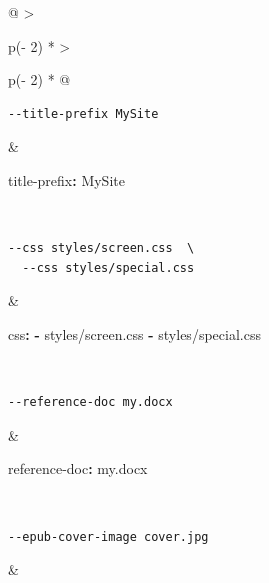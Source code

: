 \documentclass[
  b5paper
]{book}
\newenvironment{Shaded}{}{}
\newcommand{\AttributeTok}[1]{\textcolor[rgb]{0.49,0.56,0.16}{#1}}
\newcommand{\FunctionTok}[1]{\textcolor[rgb]{0.02,0.16,0.49}{#1}}
\newcommand{\KeywordTok}[1]{\textcolor[rgb]{0.00,0.44,0.13}{\textbf{#1}}}
\begin{document}
\begin{longtable}[]{@{}
  >{\raggedright\arraybackslash}p{(\columnwidth - 2\tabcolsep) * }
  >{\raggedright\arraybackslash}p{(\columnwidth - 2\tabcolsep) * }@{}}
\begin{minipage}[t]{\linewidth}
\begin{verbatim}
--title-prefix MySite
\end{verbatim}
\end{minipage} & \begin{minipage}[t]{\linewidth}\raggedright
\begin{Shaded}
\begin{Highlighting}[]
\FunctionTok{title{-}prefix}\KeywordTok{:}\AttributeTok{ MySite}
\end{Highlighting}
\end{Shaded}
\end{minipage} \\
\begin{minipage}[t]{\linewidth}\raggedright
\begin{verbatim}
--css styles/screen.css  \
  --css styles/special.css
\end{verbatim}
\end{minipage} & \begin{minipage}[t]{\linewidth}\raggedright
\begin{Shaded}
\begin{Highlighting}[]
\FunctionTok{css}\KeywordTok{:}
\AttributeTok{  }\KeywordTok{{-}}\AttributeTok{ styles/screen.css}
\AttributeTok{  }\KeywordTok{{-}}\AttributeTok{ styles/special.css}
\end{Highlighting}
\end{Shaded}
\end{minipage} \\
\begin{minipage}[t]{\linewidth}\raggedright
\begin{verbatim}
--reference-doc my.docx
\end{verbatim}
\end{minipage} & \begin{minipage}[t]{\linewidth}\raggedright
\begin{Shaded}
\begin{Highlighting}[]
\FunctionTok{reference{-}doc}\KeywordTok{:}\AttributeTok{ my.docx}
\end{Highlighting}
\end{Shaded}
\end{minipage} \\
\begin{minipage}[t]{\linewidth}\raggedright
\begin{verbatim}
--epub-cover-image cover.jpg
\end{verbatim}
\end{minipage} & \begin{minipage}[t]{\linewidth}\raggedright

\end{minipage}
\end{longtable}
\end{document}
